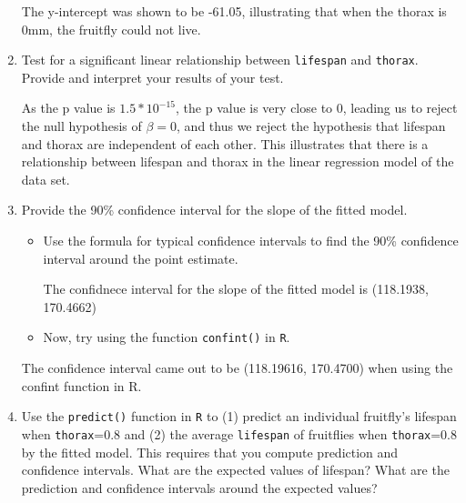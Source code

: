 \documentclass[12pt,letterpaper]{article}
\begin{document}
\begin{enumerate}
The y-intercept was shown to be -61.05, illustrating that when the thorax is 0mm, the fruitfly could not live. 
			\vspace{3cm}
	\item
	Test for a significant linear relationship between  \texttt{lifespan} and \texttt{thorax}. Provide and interpret your results of your test.
	

	
As the p value is $1.5*10^{-15}$, the p value is very close to 0, leading us to reject the null hypothesis of $\beta = 0$, and thus we reject the hypothesis that lifespan and thorax are independent of each other. This illustrates that there is a relationship between lifespan and thorax in the linear regression model of the data set. 

\newpage
	\item
	
	Provide the 90\% confidence interval for the slope of the fitted model.
	
			\vspace{.5cm}
	\begin{itemize}
		\item
		Use the formula for typical confidence intervals to find the 90\% confidence interval around the point estimate.		\vspace{.5cm}
		


The confidnece interval for the slope of the fitted model is (118.1938, 170.4662)

		\item
		Now, try using the function  \texttt{confint()}  in \texttt{R}.
	\end{itemize}

The confidence interval came out to be (118.19616, 170.4700) when using the confint function in R. 

			\vspace{3cm}
	\item Use the \texttt{predict()} function in \texttt{R} to (1) predict an individual fruitfly's lifespan when \texttt{thorax}=0.8 and (2) the average \texttt{lifespan} of fruitflies when \texttt{thorax}=0.8 by the fitted model. This requires that you compute prediction and confidence intervals. What are the expected values of lifespan? What are the prediction and confidence intervals around the expected values? 


\end{enumerate}
\end{document}
